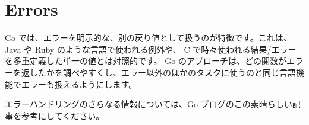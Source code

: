 \section{Errors}

Go では、エラーを明示的な、別の戻り値として扱うのが特徴です。これは、Java や Ruby のような言語で使われる例外や、 C で時々使われる結果/エラーを多重定義した単一の値とは対照的です。 Go のアプローチは、どの関数がエラーを返したかを調べやすくし、エラー以外のほかのタスクに使うのと同じ言語機能でエラーも扱えるようにします。




エラーハンドリングのさらなる情報については、Go ブログのこの素晴らしい記事を参考にしてください。
